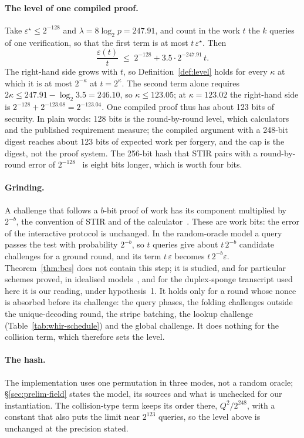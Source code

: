 \paragraph{The level of one compiled proof.} Take $\varepsilon^\star \le 2^{-128}$ and $\lambda = 8\log_2 p = 247.91$, and count in the work $t$ the $k$ queries of one verification, so that the first term is at most $t\,\varepsilon^\star$. Then
\[
  \frac{\varepsilon(t)}{t} \;\le\; 2^{-128} + 3.5 \cdot 2^{-247.91}\, t .
\]
The right-hand side grows with $t$, so Definition~\ref{def:level} holds for every $\kappa$ at which it is at most $2^{-\kappa}$ at $t = 2^{\kappa}$. The second term alone requires $2\kappa \le 247.91 - \log_2 3.5 = 246.10$, so $\kappa \le 123.05$; at $\kappa = 123.02$ the right-hand side is $2^{-128} + 2^{-123.08} = 2^{-123.04}$. One compiled proof thus has about 123 bits of security. In plain words: 128 bits is the round-by-round level, which calculators and the published requirement measure; the compiled argument with a 248-bit digest reaches about 123 bits of expected work per forgery, and the cap is the digest, not the proof system. The 256-bit hash that STIR pairs with a round-by-round error of $2^{-128}$~\citep[\S6.2]{stir} is eight bits longer, which is worth four bits.

\paragraph{Grinding.} A challenge that follows a $b$-bit proof of work has its component multiplied by $2^{-b}$, the convention of STIR and of the calculator~\citep[\S6.2]{stir}. These are work bits: the error of the interactive protocol is unchanged. In the random-oracle model a query passes the test with probability $2^{-b}$, so $t$ queries give about $t\,2^{-b}$ candidate challenges for a ground round, and its term $t\,\varepsilon$ becomes $t\,2^{-b}\varepsilon$. Theorem~\ref{thm:bcs} does not contain this step; it is studied, and for particular schemes proved, in idealised models~\citep{riv26,bcg26}, and for the duplex-sponge transcript used here it is our reading, under hypothesis~1. It holds only for a round whose nonce is absorbed before its challenge: the query phases, the folding challenges outside the unique-decoding round, the stripe batching, the lookup challenge (Table~\ref{tab:whir-schedule}) and the global challenge. It does nothing for the collision term, which therefore sets the level.

\paragraph{The hash.} The implementation uses one permutation in three modes, not a random oracle; \S\ref{sec:prelim-field} states the model, its sources and what is unchecked for our instantiation. The collision-type term keeps its order there, $Q^2/2^{248}$, with a constant that also puts the limit near $2^{123}$ queries, so the level above is unchanged at the precision stated.

